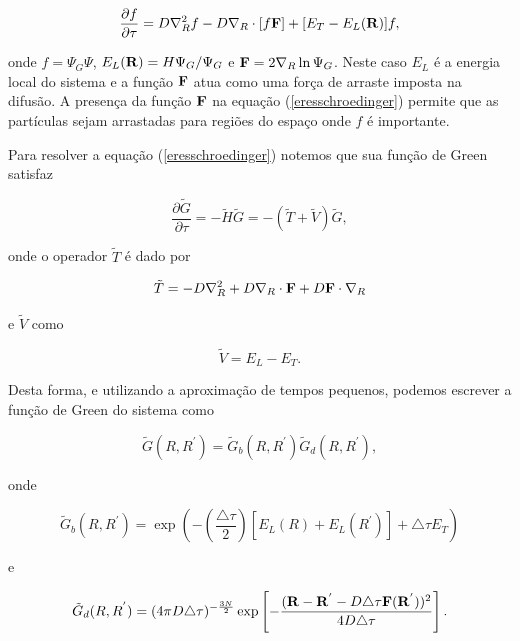 \documentclass[12pt,twoside,a4paper]{report}
\begin{document}
\begin{equation} \label{eresschroedinger}
\frac{\partial f}{\partial \tau} = D \nabla_R^2 f - D
\nabla_R \cdot [f{\bf F}] + [E_T - E_L({\bf R})] f,
\end{equation}

\noindent onde $f=\Psi_G\Psi$, $E_L({\bf R})={H \Psi_G}/{\Psi_G}$ e ${\bf 
F}=
2\nabla_R \ln
\Psi_G$. Neste caso $E_L$ é a energia local do sistema e a função
${\bf F}$ atua como
uma força de arraste imposta na difusão. A presença da função
${\bf F}$ na equação
(\ref{eresschroedinger}) permite que as partículas sejam
arrastadas para regiões do
espaço onde $f$ é importante.

Para resolver a equação (\ref{eresschroedinger}) notemos que sua
função de Green
satisfaz

\begin{equation}
\frac{\partial \tilde{G}}{\partial \tau} = - \tilde{H}\tilde{G} =
- (\tilde{T} +\tilde{V}) \tilde{G},
\end{equation}

\noindent onde o operador $\tilde{T}$ é dado por

\begin{equation}
\tilde{T}= - D \nabla_R^2 + D  \nabla_R \cdot {\bf F}+ D
{\bf F} \cdot \nabla_R
\end{equation}

\noindent e $\tilde{V}$ como

\begin{equation}
\tilde{V} = E_L - E_T.
\end{equation}

\noindent Desta forma, e utilizando a aproximação de tempos pequenos, 
podemos
escrever a função de Green do sistema como

\begin{equation} \label{fgreen2}
\tilde{G}(R,R^{'})= \tilde{G}_b(R,R^{'}) \tilde{G}_d(R,R^{'}),
\end{equation}

\noindent onde

\begin{equation} \label{gb2}
\tilde{G}_b(R,R^{'}) = \exp(- (\frac{\triangle\tau}{2}) [E_L(R)
+ E_L(R^{'})] + \triangle\tau E_T)
\end{equation}

\noindent e

\begin{equation} \label{gd2}
\tilde{G}_d(R,R^{'}) =  (4 \pi D
\triangle\tau)^{-\frac{3N}{2}} \exp \left[- \frac{({\bf R} - {\bf
R}^{'} -
D\triangle\tau {\bf F({\bf R}^{'})})^2}{4D\triangle\tau} \right].
\end{equation}
\end{document}
